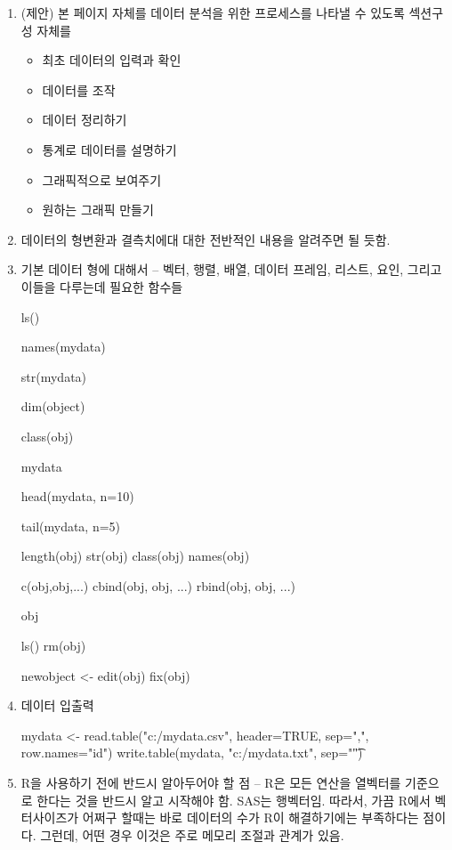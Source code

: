 \documentclass{article}
\begin{document}
\begin{enumerate}
	

	\item (제안) 본 페이지 자체를 데이터 분석을 위한 프로세스를 나타낼 수 있도록 섹션구성 자체를
	\begin{itemize}
		\item 최초 데이터의 입력과 확인 
		\item 데이터를 조작
		\item 데이터 정리하기 
		\item 통계로 데이터를 설명하기 
		\item 그래픽적으로 보여주기 
		\item 원하는 그래픽 만들기
	\end{itemize}
	\item 데이터의 형변환과 결측치에대 대한 전반적인 내용을 알려주면 될 듯함.

	\item 기본 데이터 형에 대해서 -- 벡터, 행렬, 배열, 데이터 프레임, 리스트, 요인, 그리고 이들을 다루는데 필요한 함수들 
	\begin{Schunk}
	\begin{Soutput}
	ls()

	names(mydata)

	str(mydata)


	dim(object)

	class(obj)

	mydata

	head(mydata, n=10)

	tail(mydata, n=5) 

	length(obj)
	str(obj)
	class(obj)
	names(obj)
	
	c(obj,obj,...)
	cbind(obj, obj, ...)
	rbind(obj, obj, ...)
	
	obj
	
	ls()
	rm(obj)
	
	newobject <- edit(obj)
	fix(obj)
	\end{Soutput}
	\end{Schunk}


	\item 데이터 입출력 
	\begin{Schunk}
	\begin{Soutput}
	mydata <- read.table("c:/mydata.csv", header=TRUE, sep=",", row.names="id")
	write.table(mydata, "c:/mydata.txt", sep="\t") 
	\end{Soutput}
	\end{Schunk}
	\item R을 사용하기 전에 반드시 알아두어야 할 점 -- R은 모든 연산을 열벡터를 기준으로 한다는 것을 반드시 알고 시작해야 함.  SAS는 행벡터임.  따라서, 가끔 R에서 벡터사이즈가 어쩌구 할때는 바로 데이터의 수가 R이 해결하기에는 부족하다는 점이다.  그런데, 어떤 경우 이것은 주로 메모리 조절과 관계가 있음. 
	

\end{enumerate}
\end{document}

